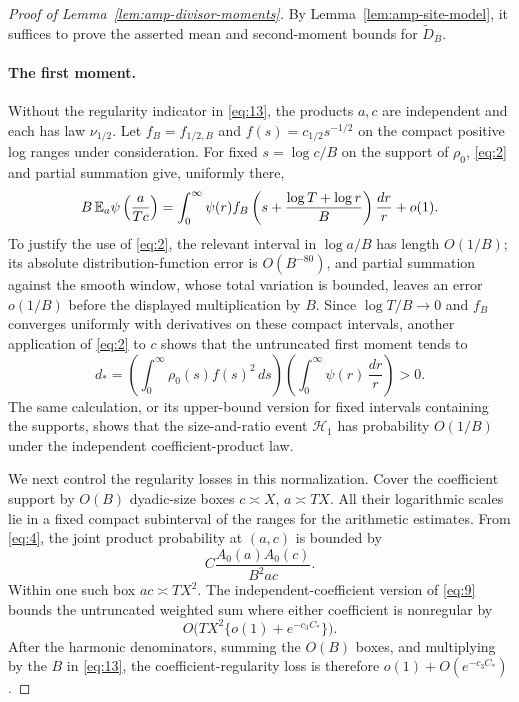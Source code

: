 \begin{proof}[Proof of Lemma~\ref{lem:amp-divisor-moments}]
By Lemma~\ref{lem:amp-site-model}, it suffices to prove the asserted
mean and second-moment bounds for $\widetilde D_B$.

\paragraph{The first moment.}
Without the regularity indicator in \eqref{eq:13}, the products
$a,c$ are independent and each has law $\nu_{1/2}$.  Let
$f_B=f_{1/2,B}$ and $f(s)=c_{1/2}s^{-1/2}$ on the compact positive
log ranges under consideration.  For fixed $s=\log c/B$ on the
support of $\rho_0$, \eqref{eq:2} and partial summation give, uniformly
there,
\[
 B\,\mathbb E_a\psi\left(\frac{a}{Tc}\right)
 =\int_0^\infty
    \psi(r)f_B\left(s+\frac{\log T+\log r}{B}\right)
    \frac{dr}{r}+o(1).
\]
To justify the use of \eqref{eq:2}, the relevant interval in
$\log a/B$ has length $O(1/B)$; its absolute distribution-function
error is $O(B^{-80})$, and partial summation against the smooth
window, whose total variation is bounded, leaves an error
$o(1/B)$ before the displayed multiplication by $B$.
Since $\log T/B\to0$ and $f_B$ converges uniformly with derivatives
on these compact intervals, another application of
\eqref{eq:2} to $c$ shows that the untruncated first moment tends to
\[
 d_*=
 \left(\int_0^\infty\rho_0(s)f(s)^2\,ds\right)
 \left(\int_0^\infty\psi(r)\,\frac{dr}{r}\right)>0.
\]
The same calculation, or its upper-bound version for fixed intervals
containing the supports, shows that the size-and-ratio event
$\mathcal H_1$ has probability $O(1/B)$ under the independent
coefficient-product law.

We next control the regularity losses in this normalization.  Cover
the coefficient support by $O(B)$ dyadic-size boxes
$c\asymp X$, $a\asymp TX$.  All their logarithmic scales lie in a
fixed compact subinterval of the ranges for the arithmetic
estimates.  From \eqref{eq:4}, the joint product probability at
$(a,c)$ is bounded by
\[
 C\frac{A_0(a)A_0(c)}{B^2ac}.
\]
Within one such box $ac\asymp TX^2$.  The independent-coefficient
version of \eqref{eq:9} bounds the untruncated weighted sum where
either coefficient is nonregular by
\[
 O\bigl(TX^2\{o(1)+e^{-c_3C_*}\}\bigr).
\]
After the harmonic denominators, summing the $O(B)$ boxes, and
multiplying by the $B$ in \eqref{eq:13}, the coefficient-regularity
loss is therefore $o(1)+O(e^{-c_3C_*})$.


\end{proof}
